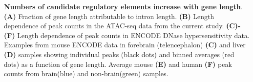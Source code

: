 \textbf{Numbers of candidate regulatory elements increase with gene length}. \textbf{(A)} Fraction of gene length attributable to intron
length. \textbf{(B)} Length dependence of peak counts in the ATAC-seq data from the current study. \textbf{(C)-(F)} Length dependence of peak counts in ENCODE DNase hypersensitivity data. Examples from mouse ENCODE data in forebrain (telencephalon) \textbf{(C)} and liver \textbf{(D)} samples showing individual peaks (black dots) and binned averages (red dots) as a function of gene length. Average mouse \textbf{(E)} and human \textbf{(F)} peak counts from brain(blue) and non-brain(green) samples.

